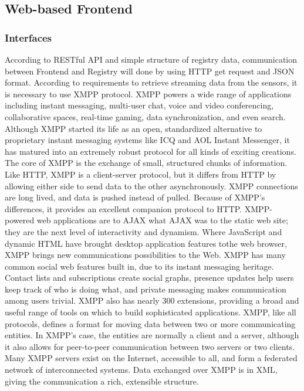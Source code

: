   \subsection{Web-based Frontend}
    \subsubsection{Interfaces}
    According to RESTful API and simple structure of registry data, communication between Frontend and Registry will done by using HTTP get request and JSON format.
    \newline
    According to requirements to retrieve streaming data from the sensors, it is necessary to use XMPP protocol\cite{XMPPbook}.
    XMPP powers a wide range of applications including instant messaging, multi-user chat, voice and video conferencing, collaborative spaces, real-time gaming, data synchronization, and even search. Although XMPP started its life as an open, standardized alternative to proprietary instant messaging systems like ICQ and AOL Instant Messenger, it has matured into an extremely robust protocol for all kinds of exciting creations.
    The core of XMPP is the exchange of small, structured chunks of information. Like HTTP, XMPP is a client-server protocol, but it differs from HTTP by allowing either side to send data to the other asynchronously. XMPP connections are long lived, and data is pushed instead of pulled. Because of XMPP’s differences, it provides an excellent companion protocol to HTTP. XMPP-powered web applications are to AJAX what AJAX was to the static web site; they are the next level of interactivity and dynamism. Where JavaScript and dynamic HTML have brought desktop application features tothe web browser, XMPP brings new communications possibilities to the Web. XMPP has many common social web features built in, due to its instant messaging heritage. Contact lists and subscriptions create social graphs, presence updates help users keep track of who is doing what, and private messaging makes communication among users trivial. XMPP also has nearly 300 extensions, providing a broad and useful range of tools on which to build sophisticated applications. 
    XMPP, like all protocols, defines a format for moving data between two or more communicating
entities. In XMPP’s case, the entities are normally a client and a server, although it also allows for
peer-to-peer communication between two servers or two clients. Many XMPP servers exist on the
Internet, accessible to all, and form a federated network of interconnected systems.
Data exchanged over XMPP is in XML, giving the communication a rich, extensible structure.
